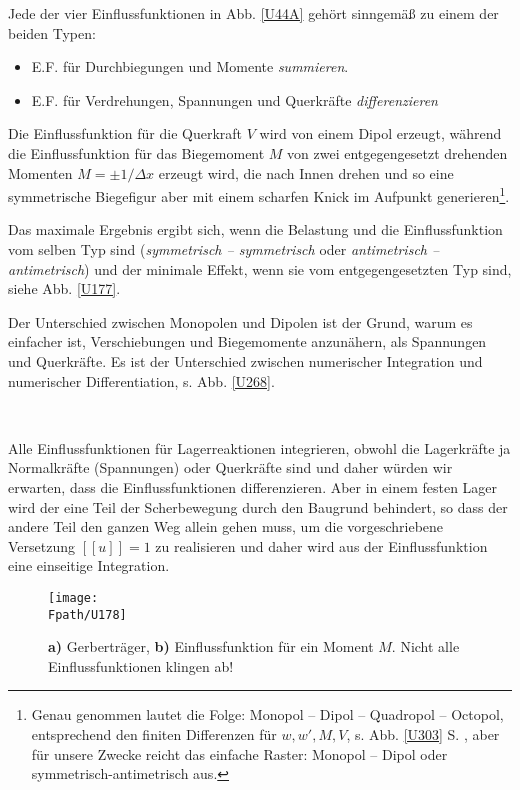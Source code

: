 Jede der vier Einflussfunktionen in Abb. \ref{U44A} geh\"{o}rt sinngem\"{a}{\ss} zu einem der beiden Typen:\\

\begin{itemize}
  \item E.F. f\"{u}r Durchbiegungen und Momente {\em summieren\/}.
  \item E.F. f\"{u}r Verdrehungen, Spannungen und Querkr\"{a}fte {\em  differenzieren\/}
\end{itemize}

Die Einflussfunktion f\"{u}r die Querkraft $V$ wird von einem Dipol erzeugt, w\"{a}hrend die Einflussfunktion f\"{u}r das Biegemoment $M$ von zwei entgegengesetzt drehenden Momenten $M = \pm 1/\Delta x$ erzeugt wird, die nach Innen drehen und so eine symmetrische Biegefigur aber mit einem scharfen Knick im Aufpunkt generieren\footnote{Genau genommen lautet die Folge: Monopol -- Dipol -- Quadropol -- Octopol, entsprechend den finiten Differenzen f\"{u}r $w, w', M, V$, s. Abb. \ref{U303} S. \pageref{U303}, aber f\"{u}r unsere Zwecke reicht das einfache Raster: Monopol -- Dipol oder symmetrisch-antimetrisch aus.}.\label{Korrektur6}
 \label{Footnote1}

Das maximale Ergebnis ergibt sich, wenn die Belastung und die Einflussfunktion vom selben Typ sind ({\em symmetrisch -- symmetrisch\/} oder {\em anti\-metrisch -- anti\-metrisch\/}) und der minimale Effekt, wenn sie vom entgegengesetzten Typ sind, siehe Abb. \ref{U177}.
\\

\hspace*{-12pt}\colorbox{highlightBlue}{\parbox{0.98\textwidth}{Der Unterschied zwischen Monopolen und Dipolen ist der Grund, warum es einfacher ist, Verschiebungen und Biegemomente anzun\"{a}hern, als Spannungen und Querkr\"{a}fte. Es ist der Unterschied zwischen  numerischer Integration und numerischer Differentiation, s. Abb. \ref{U268}.}}\\

\begin{remark} Alle Einflussfunktionen f\"{u}r Lagerreaktionen integrieren, obwohl die Lagerkr\"{a}fte ja Normalkr\"{a}fte (Spannungen) oder Querkr\"{a}fte sind und daher w\"{u}rden wir erwarten, dass die Einflussfunktionen differenzieren. Aber in einem festen Lager wird der eine Teil der Scherbewegung durch den Baugrund behindert, so dass der andere Teil den ganzen Weg allein gehen muss, um die vorgeschriebene Versetzung $[[u]] = 1$ zu realisieren und daher wird aus der Einflussfunktion eine einseitige Integration.
\end{remark}
\begin{figure}[tbp]
\centering
\texttt{[image: \\Fpath/U178]}
\caption{\textbf{ a)} Gerbertr\"{a}ger, \textbf{ b)} Einflussfunktion f\"{u}r ein Moment $M$. Nicht alle Einflussfunktionen klingen ab! }
\label{U178}%
%
\end{figure}%

